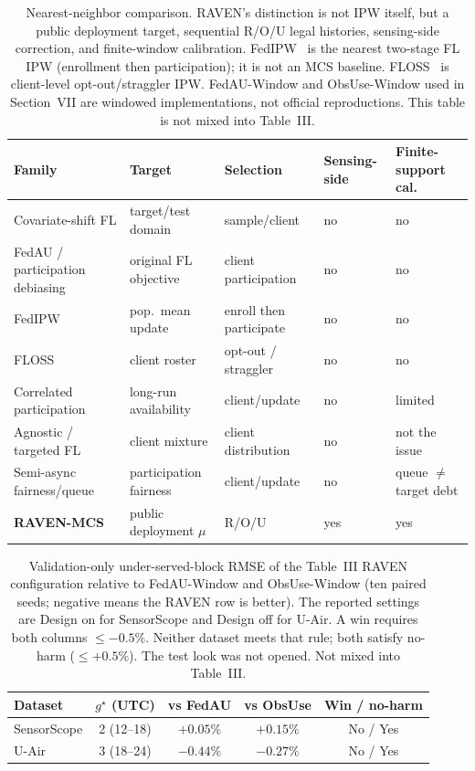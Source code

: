 \begin{table}[t]
\centering
\caption{Nearest-neighbor comparison.  RAVEN's distinction is not IPW
itself, but a public deployment target, sequential R/O/U legal
histories, sensing-side correction, and finite-window calibration.
FedIPW~\cite{morishita2026who} is the nearest two-stage FL IPW
(enrollment then participation); it is not an MCS baseline.
FLOSS~\cite{goetze2025floss} is client-level opt-out/straggler IPW.
FedAU-Window and ObsUse-Window used in Section~VII are
windowed implementations, not official reproductions.
This table is not mixed into Table~III.}
\label{tab:nearest_neighbor}
\setlength{\tabcolsep}{3.2pt}
{\footnotesize
\begin{tabular}{@{}p{2.30cm}p{2.10cm}p{2.05cm}p{1.85cm}p{2.30cm}@{}}
\toprule
Family & Target & Selection & Sensing-side & Finite-support cal.\\
\midrule
Covariate-shift FL & target/test domain & sample/client & no & no\\
FedAU / participation debiasing & original FL objective & client participation & no & no\\
FedIPW & pop.\ mean update & enroll then participate & no & no\\
FLOSS & client roster & opt-out / straggler & no & no\\
Correlated participation & long-run availability & client/update & no & limited\\
Agnostic / targeted FL & client mixture & client distribution & no & not the issue\\
Semi-async fairness/queue & participation fairness & client/update & no & queue \(\neq\) target debt\\
\textbf{RAVEN-MCS} & public deployment \(\mu\) & R/O/U & yes & yes\\
\bottomrule
\end{tabular}}
\end{table}

\begin{table}[t]
\centering
\caption{Validation-only under-served-block RMSE of the Table~III
RAVEN configuration relative
to FedAU-Window and ObsUse-Window (ten paired seeds; negative means
the RAVEN row is better).  The reported settings are Design on for SensorScope and Design off for U-Air.
A win requires both columns $\le-0.5\%$.  Neither
dataset meets that rule; both satisfy no-harm ($\le+0.5\%$).  The test
look was not opened.  Not mixed into Table~III.}
\label{tab:underserved_block}
\setlength{\tabcolsep}{3.5pt}
\begin{tabular}{lcccc}
\toprule
Dataset & $g^{\star}$ (UTC) & vs FedAU & vs ObsUse & Win / no-harm\\
\midrule
SensorScope & 2 (12--18) & $+0.05\%$ & $+0.15\%$ & No / Yes\\
U-Air & 3 (18--24) & $-0.44\%$ & $-0.27\%$ & No / Yes\\
\bottomrule
\end{tabular}
\end{table}

